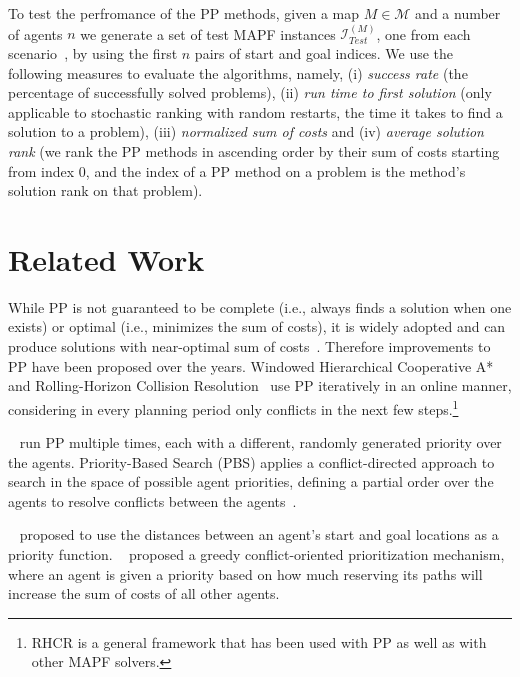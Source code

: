 \documentclass[letterpaper]{article}
\begin{document}
To test the perfromance of the PP methods, given a map $ M \in \mathcal{M} $ and a number of agents $ n $ we generate a set of test MAPF instances $ \mathcal{I}^{(M)}_{Test} $, one from each scenario~\citep{stern2019multi}, by using the first $ n $ pairs of start and goal indices. We use the following measures to evaluate the algorithms, namely, (i) \textit{success rate} (the percentage of successfully solved problems), (ii) \textit{run time to first solution} (only applicable to stochastic ranking with random restarts, the time it takes to find a solution to a problem), (iii) \textit{normalized sum of costs} and (iv) \textit{average solution rank} (we rank the PP methods in ascending order by their sum of costs starting from index $ 0 $, and the index of a PP method on a problem is the method's solution rank on that problem).

\section{Related Work}
\label{sec:relatedWork}

While PP is not guaranteed to be complete (i.e., always finds a solution when one exists) or optimal (i.e., minimizes the sum of costs), it is widely adopted and can produce solutions with near-optimal sum of costs~\citep{morag2022online}. Therefore improvements to PP have been proposed over the years. Windowed Hierarchical Cooperative A*~\citep{silver2005cooperative} and  Rolling-Horizon Collision Resolution~\citep{li2021lifelong} use PP iteratively in an online manner, considering in every planning period only conflicts in the next few steps.\footnote{RHCR is a general framework that has been used with PP as well as with other MAPF solvers.}

~\citet{bennewitz2002finding} run PP multiple times, each with a different, randomly generated priority over the agents. Priority-Based Search (PBS) applies a conflict-directed approach to search in the space of possible agent priorities, defining a partial order over the agents to resolve conflicts between the agents~\citep{ma2019searching}.

~\citet{van2005prioritized} proposed to use the distances between an agent's start and goal locations as a priority function. ~\citet{bnaya2014conflict} proposed a greedy conflict-oriented prioritization mechanism, where an agent is given a priority based on how much reserving its paths will increase the sum of costs of all other agents.
\end{document}
